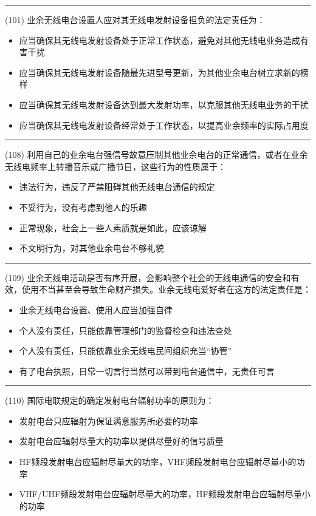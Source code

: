 \documentclass[twocolumn,hyperref,UTF8]{ctexart}  %
\begin{document}
\noindent\rule{0.5\textwidth}{1pt}
\heiti (101) 业余无线电台设置人应对其无线电发射设备担负的法定责任为： \songti {\color{gray} [LK0065] }
\begin{itemize}
	\item  应当确保其无线电发射设备处于正常工作状态，避免对其他无线电业务造成有害干扰
	\item  应当确保其无线电发射设备随最先进型号更新，为其他业余电台树立求新的榜样
	\item  应当确保其无线电发射设备达到最大发射功率，以克服其他无线电业务的干扰
	\item  应当确保其无线电发射设备经常处于工作状态，以提高业余频率的实际占用度
\end{itemize}


\noindent\rule{0.5\textwidth}{1pt}
\heiti (108) 利用自己的业余电台强信号故意压制其他业余电台的正常通信，或者在业余无线电频率上转播音乐或广播节目，这些行为的性质属于： \songti {\color{gray} [LK0072] }
\begin{itemize}
	\item  违法行为，违反了严禁阻碍其他无线电台通信的规定
	\item  不妥行为，没有考虑到他人的乐趣
	\item  正常现象，社会上一些人素质就是如此，应该谅解
	\item  不文明行为，对其他业余电台不够礼貌
\end{itemize}


\noindent\rule{0.5\textwidth}{1pt}
\heiti (109) 业余无线电活动是否有序开展，会影响整个社会的无线电通信的安全和有效，使用不当甚至会导致生命财产损失。业余无线电爱好者在这方的法定责任是： \songti {\color{gray} [LK0073] }
\begin{itemize}
	\item  业余无线电台设置、使用人应当加强自律
	\item  个人没有责任，只能依靠管理部门的监督检查和违法查处
	\item  个人没有责任，只能依靠业余无线电民间组织充当“协管”
	\item  有了电台执照，日常一切言行当然可以带到电台通信中，无责任可言
\end{itemize}


\noindent\rule{0.5\textwidth}{1pt}
\heiti (110) 国际电联规定的确定发射电台辐射功率的原则为： \songti {\color{gray} [LK0181] }
\begin{itemize}
	\item  发射电台只应辐射为保证满意服务所必要的功率
	\item  发射电台应辐射尽量大的功率以提供尽量好的信号质量
	\item  HF频段发射电台应辐射尽量大的功率，VHF频段发射电台应辐射尽量小的功率
	\item  VHF/UHF频段发射电台应辐射尽量大的功率，HF频段发射电台应辐射尽量小的功率
\end{itemize}
\end{document}
